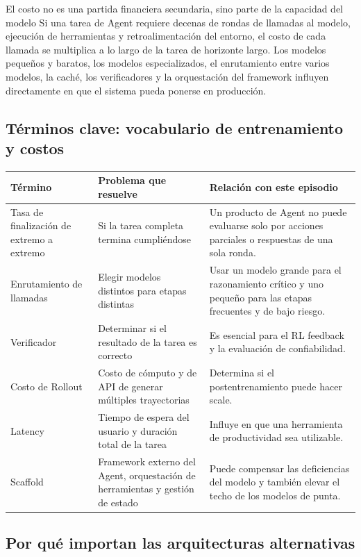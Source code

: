 \documentclass[a4paper]{article}
\begin{document}
\begin{importantbox}{El costo no es una partida financiera secundaria, sino parte de la capacidad del modelo}
Si una tarea de Agent requiere decenas de rondas de llamadas al modelo, ejecución de herramientas y retroalimentación del entorno, el costo de cada llamada se multiplica a lo largo de la tarea de horizonte largo. Los modelos pequeños y baratos, los modelos especializados, el enrutamiento entre varios modelos, la caché, los verificadores y la orquestación del framework influyen directamente en que el sistema pueda ponerse en producción.
\end{importantbox}

\subsection{Términos clave: vocabulario de entrenamiento y costos}

\noindent\begin{tabularx}{\textwidth}{p{}p{}X}
\toprule
Término & Problema que resuelve & Relación con este episodio \\
\midrule
Tasa de finalización de extremo a extremo & Si la tarea completa termina cumpliéndose & Un producto de Agent no puede evaluarse solo por acciones parciales o respuestas de una sola ronda. \\
Enrutamiento de llamadas & Elegir modelos distintos para etapas distintas & Usar un modelo grande para el razonamiento crítico y uno pequeño para las etapas frecuentes y de bajo riesgo. \\
Verificador & Determinar si el resultado de la tarea es correcto & Es esencial para el RL feedback y la evaluación de confiabilidad. \\
Costo de Rollout & Costo de cómputo y de API de generar múltiples trayectorias & Determina si el postentrenamiento puede hacer scale. \\
Latency & Tiempo de espera del usuario y duración total de la tarea & Influye en que una herramienta de productividad sea utilizable. \\
Scaffold & Framework externo del Agent, orquestación de herramientas y gestión de estado & Puede compensar las deficiencias del modelo y también elevar el techo de los modelos de punta. \\
\bottomrule
\end{tabularx}

\subsection{Por qué importan las arquitecturas alternativas}
\end{document}

